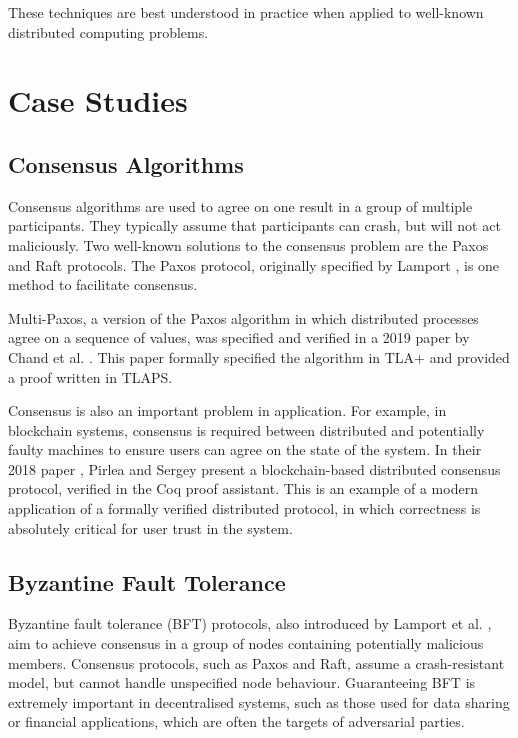 \documentclass[acmsmall,screen,review]{acmart}
\begin{document}
    These techniques are best understood in practice when applied to well-known distributed computing problems.
     
\section{Case Studies}
  \subsection{ Consensus Algorithms}
    Consensus algorithms are used to agree on one result in a group of multiple participants.
    They typically assume that participants can crash, but will not act maliciously.
    Two well-known solutions to the consensus problem are the Paxos and Raft protocols.
    The Paxos protocol, originally specified by Lamport \cite{digitalequipmentcorporationParttimeParliament2019}, is one method to facilitate consensus.

    Multi-Paxos, a version of the Paxos algorithm in which distributed processes agree on a sequence of values,
    was specified and verified in a 2019 paper by Chand et al. \cite{chandFormalVerificationMultiPaxos2016}.
    This paper formally specified the algorithm in TLA+ and provided a proof written in TLAPS.

    Consensus is also an important problem in application. 
    For example, in blockchain systems, consensus is required between distributed and potentially faulty 
    machines to ensure users can agree on the state of the system.
    In their 2018 paper \cite{pirleaMechanisingBlockchainConsensus2018},
    Pirlea and Sergey present a blockchain-based distributed consensus protocol, verified in the Coq proof assistant. 
    This is an example of a modern application of a formally verified distributed protocol,
    in which correctness is absolutely critical for user trust in the system.


  \subsection{ Byzantine Fault Tolerance}
    Byzantine fault tolerance (BFT) protocols, also introduced by Lamport et al. \cite{lamportByzantineGeneralsProblem2019},
    aim to achieve consensus in a group of nodes containing potentially malicious members.
    Consensus protocols, such as Paxos and Raft, assume a crash-resistant model, but cannot handle unspecified node behaviour.
    Guaranteeing BFT is extremely important in decentralised systems, such as those used for data sharing or financial applications,
    which are often the targets of adversarial parties.
\end{document}
